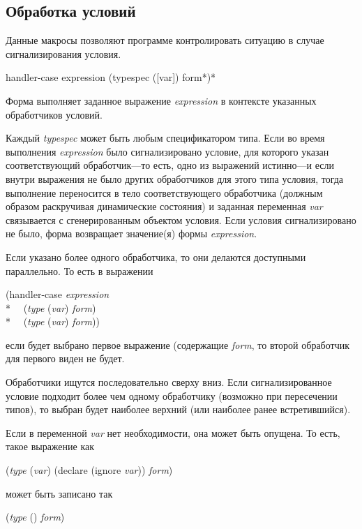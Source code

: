 \subsection{Обработка условий}

Данные макросы позволяют программе контролировать ситуацию в случае
сигнализирования условия.

\begin{defmac}
handler-case expression {(typespec ([var]) {form}*)}*

Форма выполняет заданное выражение \emph{expression} в контексте указанных
обработчиков условий.

Каждый \emph{typespec} может быть любым спецификатором типа. Если во время
выполнения \emph{expression} было сигнализировано условие, для которого указан
соответствующий обработчик---то есть, одно из выражений  истинно---и если внутри выражения не было
других обработчиков для этого типа условия, тогда выполнение переносится в тело
соответствующего обработчика (должным образом раскручивая
динамические состояния) и заданная переменная \emph{var} связывается с
сгенерированным объектом условия. Если условия сигнализировано не было, форма
 возвращает значение(я) формы \emph{expression}.

Если указано более одного обработчика, то они делаются доступными
параллельно. То есть в выражении
\begin{lisp}
(handler-case \emph{expression} \\*
~~(\emph{type} (\emph{var}) \emph{form}) \\*
~~(\emph{type} (\emph{var}) \emph{form}))
\end{lisp}
если будет выбрано первое выражение (содержащие \emph{form}, то второй
обработчик для первого виден не будет.

Обработчики ищутся последовательно сверху вниз. Если сигнализированное условие
подходит более чем одному обработчику (возможно при пересечении типов), то
выбран будет наиболее верхний (или наиболее ранее встретившийся).

Если в переменной \emph{var} нет необходимости, она может быть опущена. То есть,
такое выражение как
\begin{lisp}
(\emph{type} (\emph{var}) (declare (ignore \emph{var})) \emph{form})
\end{lisp}
может быть записано так
\begin{lisp}
(\emph{type} () \emph{form})
\end{lisp}


\end{defmac}
